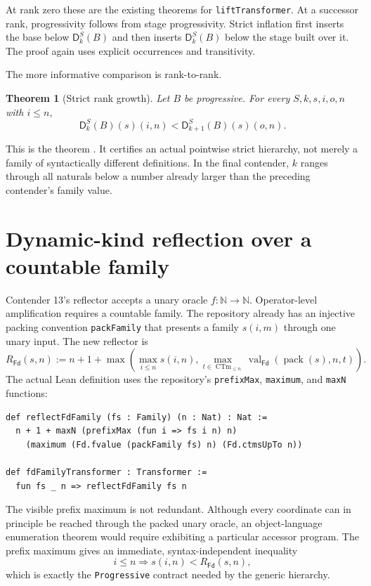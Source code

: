 \documentclass[11pt]{article}
\newtheorem{theorem}{Theorem}[section]
\theoremstyle{definition}
\newcommand{\Nat}{\mathbb{N}}
\newcommand{\diag}{\mathsf{D}}
\newcommand{\Fd}{\mathsf{Fd}}
\newcommand{\code}[1]{\texttt{#1}}
\begin{document}
At rank zero these are the existing theorems for \code{liftTransformer}.  At a successor rank, progressivity follows from stage progressivity.  Strict inflation first inserts the base below $\diag^S_k(B)$ and then inserts $\diag^S_k(B)$ below the stage built over it.  The proof again uses explicit occurrences and transitivity.

The more informative comparison is rank-to-rank.

\begin{theorem}[Strict rank growth]
Let $B$ be progressive.  For every $S,k,s,i,o,n$ with $i\le n$,
\[
  \diag^S_k(B)(s)(i,n)
  <\diag^S_{k+1}(B)(s)(o,n).
\]
\end{theorem}

This is the theorem .  It certifies an actual pointwise strict hierarchy, not merely a family of syntactically different definitions.  In the final contender, $k$ ranges through all naturals below a number already larger than the preceding contender's family value.

\section{Dynamic-kind reflection over a countable family}

Contender 13's reflector accepts a unary oracle $f:\Nat\to\Nat$.  Operator-level amplification requires a countable family.  The repository already has an injective packing convention \code{packFamily} that presents a family $s(i,m)$ through one unary input.  The new reflector is
\[
 R_{\Fd}(s,n):=
 n+1+\max\!\left(
   \max_{i\le n}s(i,n),
   \max_{t\in\operatorname{CTm}_{\le n}}
     \operatorname{val}_{\Fd}(\operatorname{pack}(s),n,t)
 \right).
\]
The actual Lean definition uses the repository's \code{prefixMax}, \code{maximum}, and \code{maxN} functions:

\begin{lstlisting}[caption={Dynamic-kind reflection with a family oracle.}]
def reflectFdFamily (fs : Family) (n : Nat) : Nat :=
  n + 1 + maxN (prefixMax (fun i => fs i n) n)
    (maximum (Fd.fvalue (packFamily fs) n) (Fd.ctmsUpTo n))

def fdFamilyTransformer : Transformer :=
  fun fs _ n => reflectFdFamily fs n
\end{lstlisting}

The visible prefix maximum is not redundant.  Although every coordinate can in principle be reached through the packed unary oracle, an object-language enumeration theorem would require exhibiting a particular accessor program.  The prefix maximum gives an immediate, syntax-independent inequality
\[
  i\le n\Longrightarrow s(i,n)<R_{\Fd}(s,n),
\]
which is exactly the \code{Progressive} contract needed by the generic hierarchy.
\end{document}
